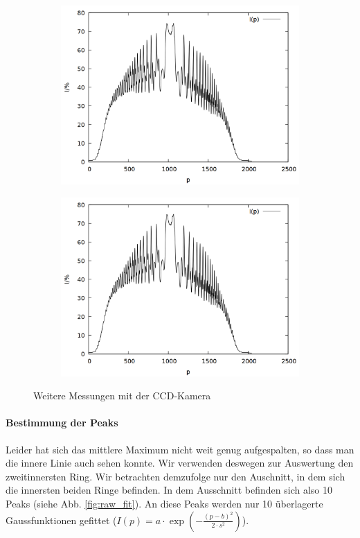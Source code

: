 \begin{figure}
\begin{subfigure}{0.45\textwidth}
\includegraphics[width=\textwidth]{data/zeeman/out_8_4_raw.png}
\end{subfigure}
\begin{subfigure}{0.45\textwidth}
\includegraphics[width=\textwidth]{data/zeeman/out_8_5_raw.png}
\end{subfigure}
\caption{Weitere Messungen mit der CCD-Kamera}
\label{fig:raw}
\end{figure}

\paragraph{Bestimmung der Peaks}
Leider hat sich das mittlere Maximum nicht weit genug aufgespalten, so dass man die innere Linie auch sehen konnte. Wir verwenden deswegen zur Auswertung den zweitinnersten Ring. Wir betrachten demzufolge nur den Auschnitt, in dem sich die innersten beiden Ringe befinden. In dem Ausschnitt befinden sich also 10 Peaks (siehe Abb. \ref{fig:raw_fit}). An diese Peaks werden nur 10 überlagerte Gaussfunktionen gefittet ($I(p) = a\cdot \exp\left(-\frac{(p-b)^2}{2\cdot s^2}\right)$).


